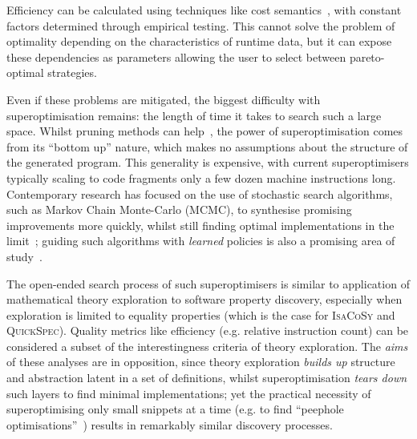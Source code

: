 Efficiency can be calculated using techniques like cost
semantics~\cite{danner2015denotational}, with constant factors determined
through empirical testing. This cannot solve the problem of optimality depending
on the characteristics of runtime data, but it can expose these dependencies as
parameters allowing the user to select between pareto-optimal strategies.

Even if these problems are mitigated, the biggest difficulty with
superoptimisation remains: the length of time it takes to search such a
large space. Whilst pruning methods can help~\cite{phothilimthana2016scaling},
the power of superoptimisation comes from its ``bottom up'' nature, which makes
no assumptions about the structure of the generated program. This generality is
expensive, with current superoptimisers typically scaling to code fragments only
a few dozen machine instructions long. Contemporary research has focused on the
use of stochastic search algorithms, such as Markov Chain Monte-Carlo (MCMC), to
synthesise promising improvements more quickly, whilst still finding optimal
implementations in the limit~\cite{schkufza2013stochastic}; guiding such
algorithms with \emph{learned} policies is also a promising area of
study~\cite{mudigonda2017learning}.

The open-ended search process of such superoptimisers is similar to application
of mathematical theory exploration to software property discovery, especially
when exploration is limited to equality properties (which is the case for
\textsc{IsaCoSy} and \textsc{QuickSpec}). Quality metrics like efficiency (e.g.
relative instruction count) can be considered a subset of the interestingness
criteria of theory exploration. The \emph{aims} of these analyses are in
opposition, since theory exploration \emph{builds up} structure and abstraction
latent in a set of definitions, whilst superoptimisation \emph{tears down} such
layers to find minimal implementations; yet the practical necessity of
superoptimising only small snippets at a time (e.g. to find ``peephole
optimisations''~\cite{Bansal.Aiken:2006}) results in remarkably similar
discovery processes.
